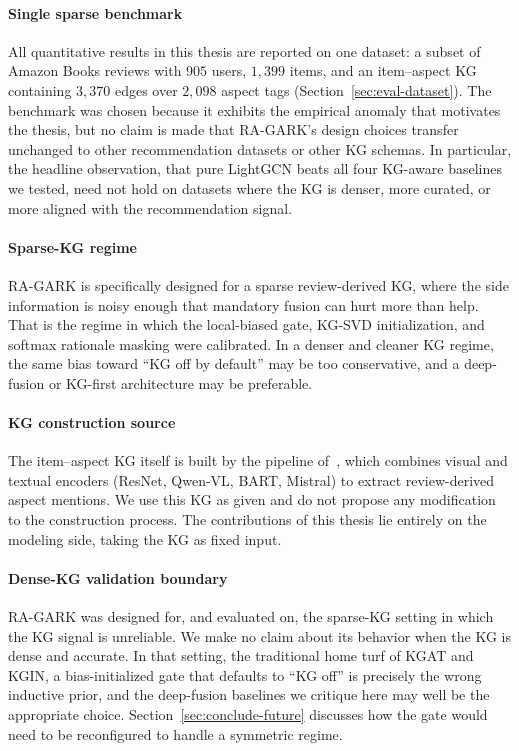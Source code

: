 \paragraph{Single sparse benchmark} All quantitative results in this thesis are reported on one dataset: a subset of Amazon Books reviews with $905$ users, $1{,}399$ items, and an item--aspect KG containing $3{,}370$ edges over $2{,}098$ aspect tags (Section~\ref{sec:eval-dataset}). The benchmark was chosen because it exhibits the empirical anomaly that motivates the thesis, but no claim is made that RA-GARK's design choices transfer unchanged to other recommendation datasets or other KG schemas. In particular, the headline observation, that pure LightGCN beats all four KG-aware baselines we tested, need not hold on datasets where the KG is denser, more curated, or more aligned with the recommendation signal.

\paragraph{Sparse-KG regime} RA-GARK is specifically designed for a sparse review-derived KG, where the side information is noisy enough that mandatory fusion can hurt more than help. That is the regime in which the local-biased gate, KG-SVD initialization, and softmax rationale masking were calibrated. In a denser and cleaner KG regime, the same bias toward ``KG off by default'' may be too conservative, and a deep-fusion or KG-first architecture may be preferable.

\paragraph{KG construction source} The item--aspect KG itself is built by the pipeline of~\cite{ho2024reviewkg}, which combines visual and textual encoders (ResNet, Qwen-VL, BART, Mistral) to extract review-derived aspect mentions. We use this KG as given and do not propose any modification to the construction process. The contributions of this thesis lie entirely on the modeling side, taking the KG as fixed input.

\paragraph{Dense-KG validation boundary} RA-GARK was designed for, and evaluated on, the sparse-KG setting in which the KG signal is unreliable. We make no claim about its behavior when the KG is dense and accurate. In that setting, the traditional home turf of KGAT and KGIN, a bias-initialized gate that defaults to ``KG off'' is precisely the wrong inductive prior, and the deep-fusion baselines we critique here may well be the appropriate choice. Section~\ref{sec:conclude-future} discusses how the gate would need to be reconfigured to handle a symmetric regime.

